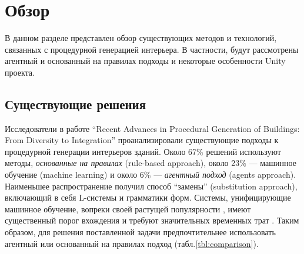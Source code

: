 
\section{Обзор}

В данном разделе представлен обзор существующих методов и технологий, связанных с процедурной генерацией интерьера. В частности, будут рассмотрены агентный и основанный на правилах подходы и некоторые особенности Unity проекта.


\subsection{Существующие решения}

Исследователи в работе \enquote{Recent Advances in Procedural Generation of Buildings: From Diversity to Integration} проанализировали существующие подходы к процедурной генерации интерьеров зданий. Около 67\% решений используют методы, \textit{основанные на правилах} (rule-based approach), около 23\% --- машинное обучение (machine learning) и около 6\% --- \textit{агентный подход} (agents approach). Наименьшее распространение получил способ \enquote{замены} (substitution approach), включающий в себя L-системы и грамматики форм. Системы, унифицирующие машинное обучение, вопреки своей растущей популярности \cite{kutzias2023recent}, имеют существенный порог вхождения и требуют значительных временных трат \cite{kan2021automatic,balint2019generalized}. Таким образом, для решения поставленной задачи предпочтительнее использовать агентный или основанный на правилах подход (табл.\ref{tbl:comparison}).

\begin{table}[b]
\begin{center}
    \caption{Сравнение методов процедурной генерации интерьеров}
    \label{tbl:comparison}
\end{center}
\end{table}

